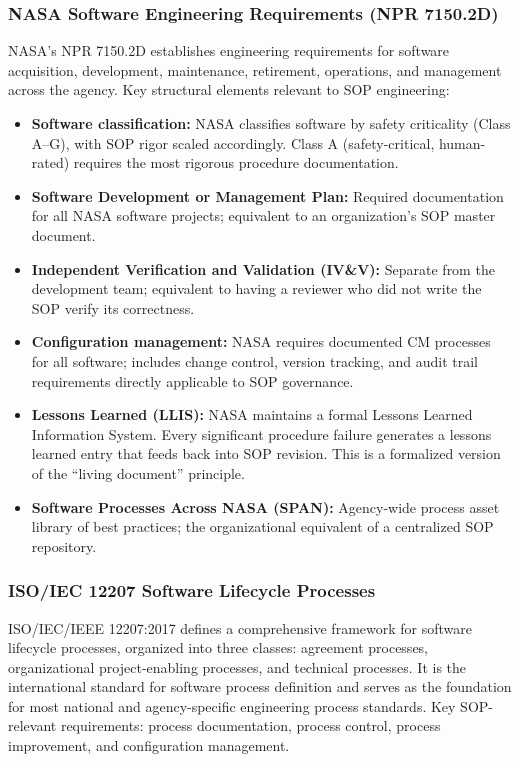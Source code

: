 \documentclass[11pt,letterpaper]{article}
\begin{document}
\subsubsection{NASA Software Engineering Requirements (NPR 7150.2D)}

NASA's NPR 7150.2D establishes engineering requirements for software acquisition, development, maintenance, retirement, operations, and management across the agency. Key structural elements relevant to SOP engineering:

\begin{itemize}[leftmargin=1.5em]
  \item \textbf{Software classification:} NASA classifies software by safety criticality (Class A--G), with SOP rigor scaled accordingly. Class A (safety-critical, human-rated) requires the most rigorous procedure documentation.
  \item \textbf{Software Development or Management Plan:} Required documentation for all NASA software projects; equivalent to an organization's SOP master document.
  \item \textbf{Independent Verification and Validation (IV\&V):} Separate from the development team; equivalent to having a reviewer who did not write the SOP verify its correctness.
  \item \textbf{Configuration management:} NASA requires documented CM processes for all software; includes change control, version tracking, and audit trail requirements directly applicable to SOP governance.
  \item \textbf{Lessons Learned (LLIS):} NASA maintains a formal Lessons Learned Information System. Every significant procedure failure generates a lessons learned entry that feeds back into SOP revision. This is a formalized version of the ``living document'' principle.
  \item \textbf{Software Processes Across NASA (SPAN):} Agency-wide process asset library of best practices; the organizational equivalent of a centralized SOP repository.
\end{itemize}

\subsubsection{ISO/IEC 12207 Software Lifecycle Processes}

ISO/IEC/IEEE 12207:2017 defines a comprehensive framework for software lifecycle processes, organized into three classes: agreement processes, organizational project-enabling processes, and technical processes. It is the international standard for software process definition and serves as the foundation for most national and agency-specific engineering process standards. Key SOP-relevant requirements: process documentation, process control, process improvement, and configuration management.
\end{document}

